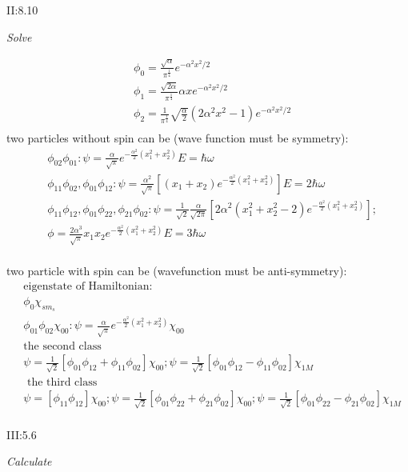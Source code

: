 \documentclass{article}
\begin{document}
II:8.10 

\textit{Solve}

\begin{align*}
&\phi_0=\frac{\sqrt{\alpha}}{\pi^{\frac14}}e^{-\alpha^2x^2/2} \\
&\phi_1=\frac{\sqrt{2\alpha}}{\pi^{\frac14}}\alpha xe^{-\alpha^2x^2/2} \\
&\phi_2=\frac1{\pi^{\frac14}}\sqrt{\frac{\alpha}2}(2\alpha^2x^2-1)e^{-\alpha^2x^2/2}\\
\end{align*}
two particles without spin can be (wave function must be symmetry):
\begin{align*}
&\phi_{02}\phi_{01}:\psi=\frac{\alpha}{\sqrt{\pi}}e^{-\frac{\alpha^2}2(x_1^2+x_2^2)} E=\hbar\omega\\
&\phi_{11}\phi_{02},\phi_{01}\phi_{12}:\psi=\frac{\alpha^2}{\sqrt{\pi}} [(x_1+x_2)e^{-\frac{\alpha^2}2(x_1^2+x_2^2)}] E=2\hbar\omega\\
&\phi_{11}\phi_{12},\phi_{01}\phi_{22},\phi_{21}\phi_{02}:\psi=\frac1{\sqrt{2}}\frac{\alpha}{\sqrt{2\pi}} [2\alpha^2(x_1^2+x_2^2-2)e^{-\frac{\alpha^2}2(x_1^2+x_2^2)}];\\
&\phi=\frac{2\alpha^3}{\sqrt{\pi}}x_1x_2e^{-\frac{\alpha^2}2(x_1^2+x_2^2)} E=3\hbar\omega\\
\end{align*}

two particle with spin can be (wavefunction must be anti-symmetry):
\begin{align*}
&\text{eigenstate of Hamiltonian:}\\
&\phi_0\chi_{sm_s} \\
&\phi_{01}\phi_{02}\chi_{00}:\psi=\frac{\alpha}{\sqrt{\pi}}e^{-\frac{\alpha^2}2(x_1^2+x_2^2)}\chi_{00}\\
&\text{the second class}\\
&\psi=\frac1{\sqrt{2}}[\phi_{01}\phi_{12}+\phi_{11}\phi_{02}]\chi_{00};\psi=\frac1{\sqrt{2}}[\phi_{01}\phi_{12}-\phi_{11}\phi_{02}]\chi_{1M} \\
&\text{ the third class}\\
&\psi=[\phi_{11}\phi_{12}]\chi_{00};\psi=\frac1{\sqrt{2}}[\phi_{01}\phi_{22}+\phi_{21}\phi_{02}]\chi_{00};\psi=\frac1{\sqrt{2}}[\phi_{01}\phi_{22}-\phi_{21}\phi_{02}]\chi_{1M} \\
\end{align*}

III:5.6 

\textit{Calculate}
\end{document}
